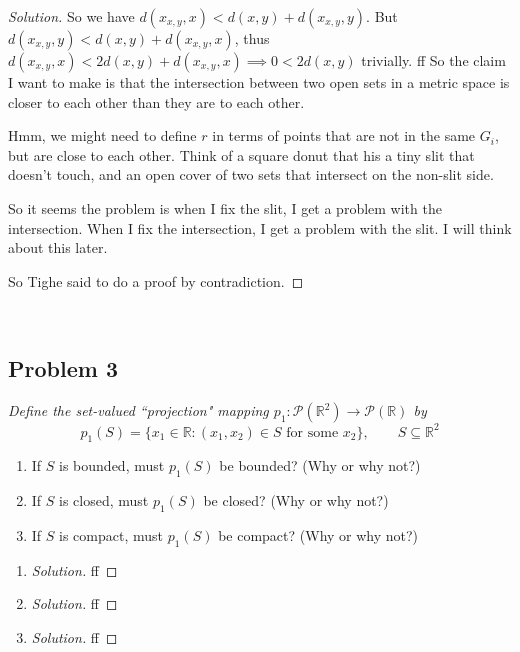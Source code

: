 \documentclass{article}
\newcommand{\R}{{\mathbb R}}
\begin{document}
\begin{proof}[Solution]
	So we have $d(x_{x,y}, x) < d(x,y) + d(x_{x,y},y)$.
	But $d(x_{x,y},y) < d(x,y) + d(x_{x,y},x)$, thus
	$d(x_{x,y}, x) < 2d(x,y) + d(x_{x,y},x) \implies 0 < 2d(x,y)$ trivially.
	ff
	So the claim I want to make is that the intersection between
	two open sets in a metric space is closer to each other than
	they are to each other.


	Hmm, we might need to define $r$ in terms of points that are
	not in the same $G_i$, but are close to each other.
	Think of a square donut that his a tiny slit that doesn't touch,
	and an open cover of two sets that intersect on the non-slit side.

	So it seems the problem is when I fix the slit,
	I get a problem with the intersection.
	When I fix the intersection, I get a problem with the slit.
	I will think about this later.


	So Tighe said to do a proof by contradiction.
\end{proof}
\clearpage
~\clearpage

\subsection*{Problem 3}
{\it Define the set-valued ``projection" mapping
$p_1 \colon \mathcal{P}(\R^2) \to \mathcal{P}(\R)$ by
\[
	p_1(S) = \{x_1 \in \R \colon (x_1,x_2) \in S \text{ for some }x_2\},
	\qquad S \subseteq \R^2
\]
\begin{enumerate}
	\item If $S$ is bounded, must $p_1(S)$ be bounded? (Why or why not?)
	\item If $S$ is closed, must $p_1(S)$ be closed? (Why or why not?)
	\item If $S$ is compact, must $p_1(S)$ be compact? (Why or why not?)
\end{enumerate}}

\begin{enumerate}
	\item \begin{proof}[Solution]\let\qed\relax
		ff
	\end{proof}
	\item \begin{proof}[Solution]\let\qed\relax
		ff
	\end{proof}
	\item \begin{proof}[Solution]\let\qed\relax
		ff
	\end{proof}
\end{enumerate}
\clearpage
~\clearpage
\end{document}
